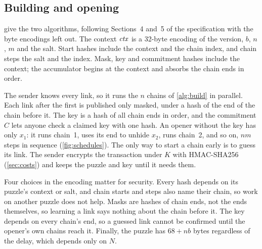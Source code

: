 \subsection{Building and opening}\label{sec:algorithms}

 give the two algorithms, following Sections~4 and~5 of the specification with the byte encodings left out. The context $\mathit{ctx}$ is a 32-byte encoding of the version, $b$, $n$, $m$ and the salt. Start hashes include the context and the chain index, and chain steps the salt and the index. Mask, key and commitment hashes include the context; the accumulator begins at the context and absorbs the chain ends in order.

The sender knows every link, so it runs the $n$ chains of \cref{alg:build} in parallel. Each link after the first is published only masked, under a hash of the end of the chain before it. The key is a hash of all chain ends in order, and the commitment $C$ lets anyone check a claimed key with one hash. An opener without the key has only $x_1$: it runs chain~1, uses its end to unhide $x_2$, runs chain~2, and so on, $nm$ steps in sequence (\cref{fig:schedules}). The only way to start a chain early is to guess its link. The sender encrypts the transaction under $K$ with HMAC-SHA256 (\cref{sec:costs}) and keeps the puzzle and key until it needs them.

Four choices in the encoding matter for security. Every hash depends on its puzzle's context or salt, and chain starts and steps also name their chain, so work on another puzzle does not help. Masks are hashes of chain ends, not the ends themselves, so learning a link says nothing about the chain before it. The key depends on every chain's end, so a guessed link cannot be confirmed until the opener's own chains reach it. Finally, the puzzle has $68 + nb$ bytes regardless of the delay, which depends only on $N$.

\FloatBarrier
